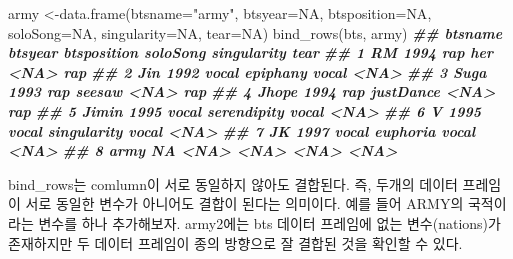 \documentclass[
]{book}
\newenvironment{Shaded}{\begin{snugshade}}{\end{snugshade}}
\newcommand{\AttributeTok}[1]{\textcolor[rgb]{0.77,0.63,0.00}{#1}}
\newcommand{\ConstantTok}[1]{\textcolor[rgb]{0.00,0.00,0.00}{#1}}
\newcommand{\DocumentationTok}[1]{\textcolor[rgb]{0.56,0.35,0.01}{\textbf{\textit{#1}}}}
\newcommand{\FunctionTok}[1]{\textcolor[rgb]{0.00,0.00,0.00}{#1}}
\newcommand{\NormalTok}[1]{#1}
\newcommand{\OtherTok}[1]{\textcolor[rgb]{0.56,0.35,0.01}{#1}}
\newcommand{\StringTok}[1]{\textcolor[rgb]{0.31,0.60,0.02}{#1}}
\theoremstyle{definition}
\theoremstyle{definition}
\theoremstyle{definition}
\theoremstyle{definition}
\theoremstyle{remark}
\begin{document}
\begin{Shaded}
\begin{Highlighting}[]
\NormalTok{army }\OtherTok{\textless{}{-}}\FunctionTok{data.frame}\NormalTok{(}\AttributeTok{btsname=}\StringTok{"army"}\NormalTok{, }\AttributeTok{btsyear=}\ConstantTok{NA}\NormalTok{, }\AttributeTok{btsposition=}\ConstantTok{NA}\NormalTok{, }\AttributeTok{soloSong=}\ConstantTok{NA}\NormalTok{, }\AttributeTok{singularity=}\ConstantTok{NA}\NormalTok{, }\AttributeTok{tear=}\ConstantTok{NA}\NormalTok{)}
\FunctionTok{bind\_rows}\NormalTok{(bts, army)}
\DocumentationTok{\#\#   btsname btsyear btsposition    soloSong singularity tear}
\DocumentationTok{\#\# 1      RM    1994         rap         her        \textless{}NA\textgreater{}  rap}
\DocumentationTok{\#\# 2     Jin    1992       vocal    epiphany       vocal \textless{}NA\textgreater{}}
\DocumentationTok{\#\# 3    Suga    1993         rap      seesaw        \textless{}NA\textgreater{}  rap}
\DocumentationTok{\#\# 4   Jhope    1994         rap   justDance        \textless{}NA\textgreater{}  rap}
\DocumentationTok{\#\# 5   Jimin    1995       vocal serendipity       vocal \textless{}NA\textgreater{}}
\DocumentationTok{\#\# 6       V    1995       vocal singularity       vocal \textless{}NA\textgreater{}}
\DocumentationTok{\#\# 7      JK    1997       vocal    euphoria       vocal \textless{}NA\textgreater{}}
\DocumentationTok{\#\# 8    army      NA        \textless{}NA\textgreater{}        \textless{}NA\textgreater{}        \textless{}NA\textgreater{} \textless{}NA\textgreater{}}
\end{Highlighting}
\end{Shaded}

bind\_rows는 comlumn이 서로 동일하지 않아도 결합된다. 즉, 두개의 데이터 프레임이 서로 동일한 변수가 아니어도 결합이 된다는 의미이다. 예를 들어 ARMY의 국적이라는 변수를 하나 추가해보자. army2에는 bts 데이터 프레임에 없는 변수(nations)가 존재하지만 두 데이터 프레임이 종의 방향으로 잘 결합된 것을 확인할 수 있다.
\end{document}
